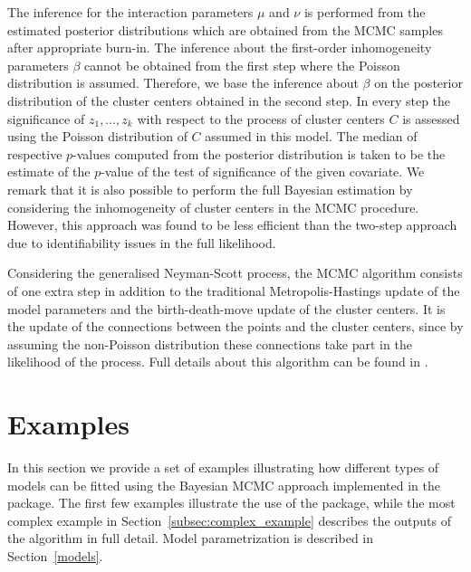 The inference for the interaction parameters $\mu$ and $\nu$ is performed from the estimated posterior distributions which are obtained from the MCMC samples after appropriate burn-in. The inference about the first-order inhomogeneity parameters $\beta$ cannot be obtained from the first step where the Poisson distribution is assumed. Therefore, we base the inference about $\beta$ on the posterior distribution of the cluster centers obtained in the second step. In every step the significance of $z_1, \ldots, z_k$ with respect to the process of cluster centers $C$ is assessed using the Poisson distribution of $C$ assumed in this model. The median of respective $p$-values computed from the posterior distribution is taken to be the estimate of the $p$-value of the test of significance of the given covariate. We remark that it is also possible to perform the full Bayesian estimation by considering the inhomogeneity of cluster centers in the MCMC procedure. However, this approach was found to be less efficient than the two-step approach due to identifiability issues in the full likelihood.

Considering the generalised Neyman-Scott process, the MCMC algorithm consists of one extra step in addition to the traditional Metropolis-Hastings update of the model parameters and the birth-death-move update of the cluster centers. It is the update of the connections between the points and the cluster centers, since by assuming the non-Poisson distribution these connections take part in the likelihood of the process. Full details about this algorithm can be found in \cite{AM2020}.

\section{Examples} \label{examples}

In this section we provide a set of examples illustrating how different types of models can be fitted using the Bayesian MCMC approach implemented in the  package. The first few examples illustrate the use of the package, while the most complex example in Section~\ref{subsec:complex_example} describes the outputs of the algorithm in full detail. Model parametrization is described in Section~\ref{models}.

